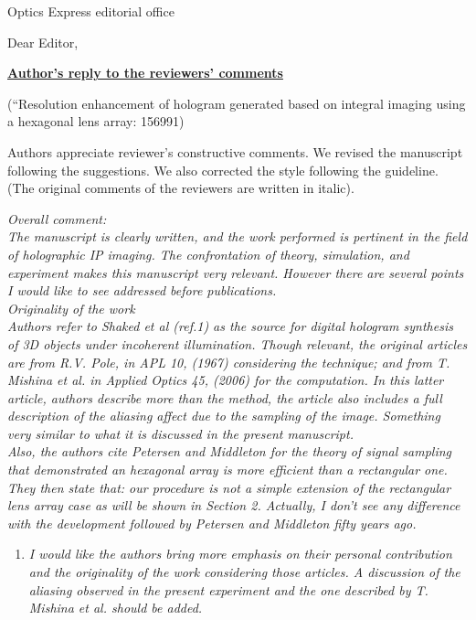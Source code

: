 \documentclass[a4paper,11pt]{letter}
\begin{document}
\begin{letter}{Optics Express editorial office}

\opening{Dear Editor,}
\begin{center}
{\bf \underline{Author's reply to the reviewers' comments} } \\
\end{center}
(``Resolution enhancement of hologram generated based on integral imaging using a hexagonal lens array: 156991)

Authors appreciate reviewer’s constructive comments. We revised the manuscript following the suggestions. We also corrected the style following the guideline. (The original comments of the reviewers are written in italic).

{}

\textit{Overall comment: \\
The manuscript is clearly written, and the work performed is pertinent in the field of holographic IP imaging. The confrontation of theory, simulation, and experiment makes this manuscript very relevant. However there are several points I would like to see addressed before publications.\\
Originality of the work\\
Authors refer to Shaked et al (ref.1) as the source for digital hologram synthesis of 3D objects under incoherent illumination. Though relevant, the original articles are from R.V. Pole, in APL 10, (1967) considering the technique; and from T. Mishina et al. in Applied Optics 45, (2006) for the computation. In this latter article, authors describe more than the method, the article also includes a full description of the aliasing affect due to the sampling of the image. Something very similar to what it is discussed in the present manuscript.\\
Also, the authors cite Petersen and Middleton for the theory of signal sampling that demonstrated an hexagonal array is more efficient than a rectangular one. 
They then state that: our procedure is not a simple extension of the rectangular lens array case as will be shown in Section 2.  Actually, I don't see any difference with the development followed by Petersen and Middleton fifty years ago.}

\begin{enumerate}

\item \textit{I would like the authors bring more emphasis on their personal contribution and the originality of the work considering those articles. A discussion of the aliasing observed in the present experiment and the one described by T. Mishina et al. should be added.}


\end{enumerate}
\end{letter}
\end{document}
